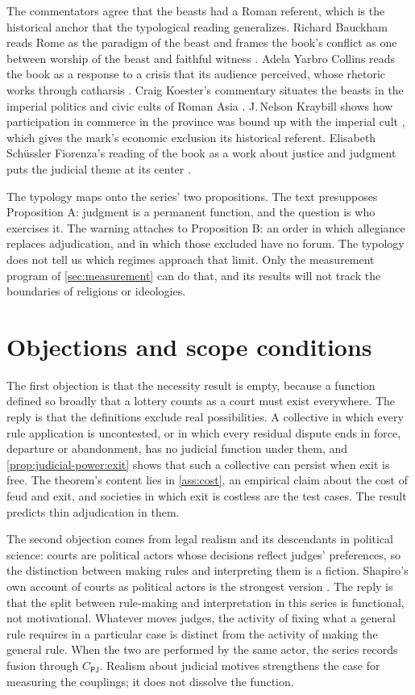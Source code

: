 \documentclass[11pt,letterpaper]{article}
\theoremstyle{definition}
\theoremstyle{remark}
\newcommand{\pP}{\mathsf{P}}
\newcommand{\pJ}{\mathsf{J}}
\begin{document}
The commentators agree that the beasts had a Roman referent, which is the historical anchor that the typological reading generalizes. Richard Bauckham reads Rome as the paradigm of the beast and frames the book's conflict as one between worship of the beast and faithful witness \citep{bauckham1993}. Adela Yarbro Collins reads the book as a response to a crisis that its audience perceived, whose rhetoric works through catharsis \citep{collins1984}. Craig Koester's commentary situates the beasts in the imperial politics and civic cults of Roman Asia \citep{koester2014}. J.\,Nelson Kraybill shows how participation in commerce in the province was bound up with the imperial cult \citep{kraybill1996}, which gives the mark's economic exclusion its historical referent. Elisabeth Sch\"ussler Fiorenza's reading of the book as a work about justice and judgment puts the judicial theme at its center \citep{schussler1985}.

The typology maps onto the series' two propositions. The text presupposes Proposition A: judgment is a permanent function, and the question is who exercises it. The warning attaches to Proposition B: an order in which allegiance replaces adjudication, and in which those excluded have no forum. The typology does not tell us which regimes approach that limit. Only the measurement program of \cref{sec:measurement} can do that, and its results will not track the boundaries of religions or ideologies.

\section{Objections and scope conditions}
\label{sec:objections}

The first objection is that the necessity result is empty, because a function defined so broadly that a lottery counts as a court must exist everywhere. The reply is that the definitions exclude real possibilities. A collective in which every rule application is uncontested, or in which every residual dispute ends in force, departure or abandonment, has no judicial function under them, and \cref{prop:judicial-power:exit} shows that such a collective can persist when exit is free. The theorem's content lies in \cref{ass:cost}, an empirical claim about the cost of feud and exit, and societies in which exit is costless are the test cases. The result predicts thin adjudication in them.

The second objection comes from legal realism and its descendants in political science: courts are political actors whose decisions reflect judges' preferences, so the distinction between making rules and interpreting them is a fiction. Shapiro's own account of courts as political actors is the strongest version \citep{shapiro1981}. The reply is that the split between rule-making and interpretation in this series is functional, not motivational. Whatever moves judges, the activity of fixing what a general rule requires in a particular case is distinct from the activity of making the general rule. When the two are performed by the same actor, the series records fusion through $C_{\pP\pJ}$. Realism about judicial motives strengthens the case for measuring the couplings; it does not dissolve the function.
\end{document}
